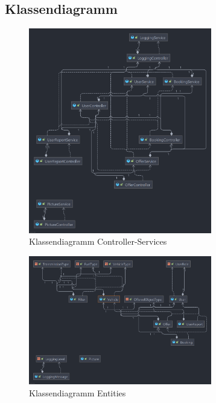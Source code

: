 \subsection{Klassendiagramm}
\begin{figure}[h]
	\centering
	\includegraphics[width=8cm]{resources/images/class diagrams/class-diagram_controller-services.png}
	\caption{Klassendiagramm Controller-Services}
	\label{fig:cd:controller-services}
\end{figure}
\begin{figure}[h]
	\centering
	\includegraphics[width=8cm]{resources/images/class diagrams/class-diagram_entities.png}
	\caption{Klassendiagramm Entities}
	\label{ffig:cd:entities}
\end{figure}

